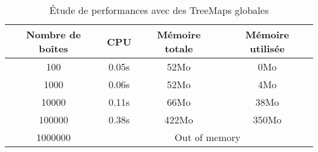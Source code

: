 








\begin{table}[h]
  \centering
\begin{tabular}{|c|c|c|c|}
\hline
Nombre de boîtes & CPU & Mémoire totale & Mémoire utilisée\\
\hline
100 & 0.05s & 52Mo & 0Mo\\
\hline
1000 & 0.06s & 52Mo & 4Mo\\
\hline
10000 & 0.11s & 66Mo & 38Mo\\
\hline
100000 & 0.38s & 422Mo & 350Mo\\
\hline
1000000 & \multicolumn{3}{|c|}{Out of memory}\\
\hline
\end{tabular}
\caption{Étude de performances avec des TreeMaps globales} 
\label{tab:treemapglobal}
\end{table}




